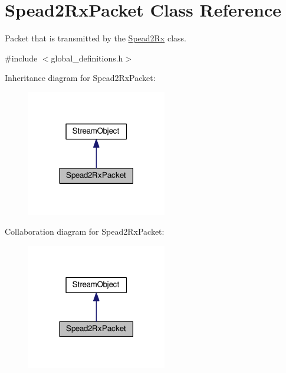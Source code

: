 \hypertarget{class_spead2_rx_packet}{}\section{Spead2\+Rx\+Packet Class Reference}
\label{class_spead2_rx_packet}


Packet that is transmitted by the \hyperlink{class_spead2_rx}{Spead2\+Rx} class.  




{\ttfamily \#include $<$global\+\_\+definitions.\+h$>$}



Inheritance diagram for Spead2\+Rx\+Packet\+:\nopagebreak
\begin{figure}[H]
\begin{center}
\leavevmode
\includegraphics[width=173pt]{class_spead2_rx_packet__inherit__graph}
\end{center}
\end{figure}


Collaboration diagram for Spead2\+Rx\+Packet\+:\nopagebreak
\begin{figure}[H]
\begin{center}
\leavevmode
\includegraphics[width=173pt]{class_spead2_rx_packet__coll__graph}
\end{center}
\end{figure}
